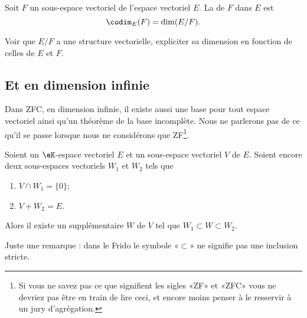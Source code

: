 \begin{definition}\label{DefCodimension}
Soit \( F\) un sous-espace vectoriel de l'espace vectoriel \( E\). La  de \( F\) dans \( E\) est
\begin{equation}
    \codim_E(F)=\dim(E/F).
\end{equation}
\end{definition}

\begin{probleme}
Voir que $E/F$ a une structure vectorielle, expliciter sa dimension en fonction de celles de $E$ et $F$.
\end{probleme}

\subsection{Et en dimension infinie}

Dans ZFC, en dimension infinie, il existe aussi une base pour tout espace vectoriel ainsi qu'un théorème de la base incomplète. Nous ne parlerons pas de ce qu'il se passe lorsque nous ne considérons que ZF\footnote{Si vous ne savez pas ce que signifient les sigles «ZF» et «ZFC» vous ne devriez pas être en train de lire ceci, et encore moins penser à le resservir à un jury d'agrégation.}.

\begin{lemma}        \label{LEMooSSRXooIyfgNz}
    Soient un \( \eK\)-espace vectoriel \( E\) et un sous-espace vectoriel \( V\) de \( E\). Soient encore deux sous-espaces vectoriels \( W_1\) et \( W_2\) tels que
    \begin{enumerate}
        \item
            \( V\cap W_1=\{ 0 \}\);
        \item
            \( V+W_2=E\).
    \end{enumerate}
    Alors il existe un supplémentaire \( W\) de \( V\) tel que \( W_1\subset W\subset W_2\).
\end{lemma}

Juste une remarque : dans le Frido le symbole «\( \subset\)» ne signifie pas une inclusion stricte.

